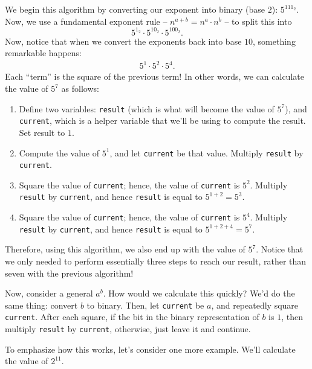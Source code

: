 \documentclass{article}
\begin{document}
We begin this algorithm by converting our exponent into binary (base $2$): $5^{111_2}$. Now, we use a fundamental exponent rule -- $n^{a+b}=n^a\cdot n^b$ -- to split this into
\[5^{1_2}\cdot 5^{10_2}\cdot 5^{100_2}.\]
Now, notice that when we convert the exponents back into base $10$, something remarkable happens:
\begin{align*}
    5^{1}\cdot 5^{2}\cdot 5^{4}.
\end{align*}
Each ``term'' is the square of the previous term! In other words, we can calculate the value of $5^7$ as follows:
\begin{enumerate}
    \item Define two variables: \texttt{result} (which is what will become the value of $5^7$), and \texttt{current}, which is a helper variable that we'll be using to compute the result. Set result to $1$.
    
    \item Compute the value of $5^1$, and let \texttt{current} be that value. Multiply \texttt{result} by \texttt{current}.
    
    \item Square the value of \texttt{current}; hence, the value of \texttt{current} is $5^2$. Multiply \texttt{result} by \texttt{current}, and hence \texttt{result} is equal to $5^{1+2}=5^3$.
    
    \item Square the value of \texttt{current}; hence, the value of \texttt{current} is $5^4$. Multiply \texttt{result} by \texttt{current}, and hence \texttt{result} is equal to $5^{1+2+4}=5^7$.
\end{enumerate}

Therefore, using this algorithm, we also end up with the value of $5^7$. Notice that we only needed to perform essentially three steps to reach our result, rather than seven with the previous algorithm! 

Now, consider a general $a^b$. How would we calculate this quickly? We'd do the same thing: convert $b$ to binary. Then, let \texttt{current} be $a$, and repeatedly square \texttt{current}. After each square, if the bit in the binary representation of $b$ is $1$, then multiply \texttt{result} by \texttt{current}, otherwise, just leave it and continue.

To emphasize how this works, let's consider one more example. We'll calculate the value of $2^{11}$.
\end{document}
